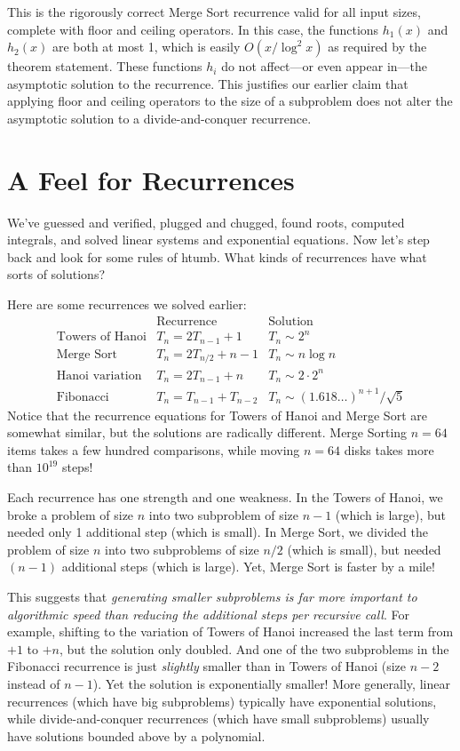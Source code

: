 This is the rigorously correct Merge Sort recurrence valid for all
input sizes, complete with floor and ceiling operators.  In this case,
the functions $h_1(x)$ and $h_2(x)$ are both at most 1, which is
easily $O(x
/ \log^2 x)$ as required by the theorem statement.  These functions
$h_i$ do not affect---or even appear in---the asymptotic solution to
the recurrence.  This justifies our earlier claim that applying floor
and ceiling operators to the size of a subproblem does not alter the
asymptotic solution to a divide-and-conquer recurrence.

\section{A Feel for Recurrences}

We've guessed and verified, plugged and chugged, found roots, computed
integrals, and solved linear systems and exponential equations.  Now
let's step back and look for some rules of htumb.  What kinds of
recurrences have what sorts of solutions?

Here are some recurrences we solved earlier:
\[
\begin{array}{cll}
& \text{Recurrence} & \text{Solution} \\
\text{Towers of Hanoi} & T_n = 2 T_{n-1} + 1 & T_n \sim 2^n \\
\text{Merge Sort} & T_n = 2 T_{n/2} + n - 1 & T_n \sim n \log n \\
\text{Hanoi variation} & T_n = 2 T_{n-1} + n & T_n \sim 2 \cdot 2^n \\
\text{Fibonacci} & T_n = T_{n-1} + T_{n-2} & T_n \sim
(1.618\ldots)^{n+1} / \sqrt{5}
\end{array}
\]
Notice that the recurrence equations for Towers of Hanoi and Merge
Sort are somewhat similar, but the solutions are radically different.
Merge Sorting $n = 64$ items takes a few hundred comparisons, while
moving $n = 64$ disks takes more than $10^{19}$ steps!

Each recurrence has one strength and one weakness. In the Towers of
Hanoi, we broke a problem of size $n$ into two subproblem of size $n -
1$ (which is large), but needed only 1 additional step (which is
small). In Merge Sort, we divided the problem of size $n$ into two
subproblems of size $n/2$ (which is small), but needed $(n - 1)$
additional steps (which is large). Yet, Merge Sort is faster by a
mile!

This suggests that \emph{generating smaller subproblems is far more
  important to algorithmic speed than reducing the additional steps
  per recursive call}.  For example, shifting to the variation of
Towers of Hanoi increased the last term from $+1$ to $+n$, but the
solution only doubled.  And one of the two subproblems in the
Fibonacci recurrence is just \emph{slightly} smaller than in Towers of
Hanoi (size $n -2$ instead of $n-1$).  Yet the solution is
exponentially smaller!  More generally, linear recurrences (which have
big subproblems) typically have exponential solutions, while
divide-and-conquer recurrences (which have small subproblems) usually
have solutions bounded above by a polynomial.

